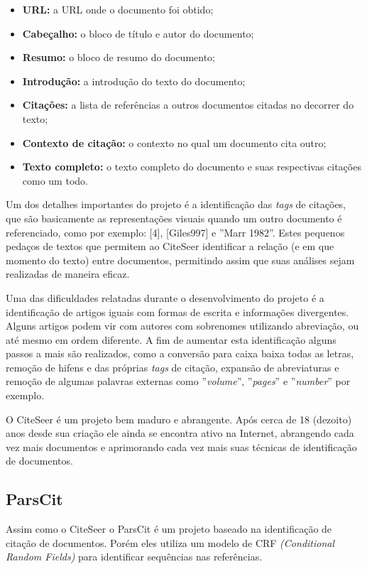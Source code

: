 \begin{itemize}
\item \textbf{URL:} a URL onde o documento foi obtido;
\item \textbf{Cabeçalho:} o bloco de título e autor do documento;
\item \textbf{Resumo:} o bloco de resumo do documento;
\item \textbf{Introdução:} a introdução do texto do documento;
\item \textbf{Citações:} a lista de referências a outros documentos citadas no decorrer do texto;
\item \textbf{Contexto de citação:} o contexto no qual um documento cita outro;
\item \textbf{Texto completo:} o texto completo do documento e suas respectivas citações como um todo.
\end{itemize}

Um dos detalhes importantes do projeto é a identificação das \textit{tags} de citações, que são basicamente as representações visuais quando um outro documento é referenciado, como por exemplo: [4], [Giles997] e ''Marr 1982''. Estes pequenos pedaços de textos que permitem ao CiteSeer identificar a relação (e em que momento do texto) entre documentos, permitindo assim que suas análises sejam realizadas de maneira eficaz.

Uma das dificuldades relatadas durante o desenvolvimento do projeto é a identificação de artigos iguais com formas de escrita e informações divergentes. Alguns artigos podem vir com autores com sobrenomes utilizando abreviação, ou até mesmo em ordem diferente. A fim de aumentar esta identificação alguns passos a mais são realizados, como a conversão para caixa baixa todas as letras, remoção de hifens e das próprias \textit{tags} de citação, expansão de abreviaturas e remoção de algumas palavras externas como ''\textit{volume}'', ''\textit{pages}'' e ''\textit{number}'' por exemplo.

O CiteSeer é um projeto bem maduro e abrangente. Após cerca de 18 (dezoito) anos desde sua criação ele ainda se encontra ativo na Internet, abrangendo cada vez mais documentos e aprimorando cada vez mais suas técnicas de identificação de documentos.

\subsection{ParsCit}
\label{tec-parscit}

Assim como o CiteSeer o ParsCit é um projeto baseado na identificação de citação de documentos. Porém eles utiliza um modelo de CRF \textit{(Conditional Random Fields)} para identificar sequências nas referências. 

